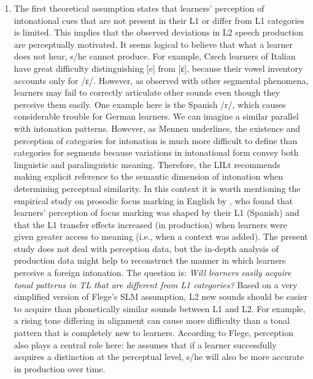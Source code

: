 \begin{enumerate}[label={(\arabic*)}]
\item
         The first theoretical assumption states that learners’ perception of intonational cues that are not present in their L1 or differ from L1 categories is limited. This implies that the observed deviations in L2 speech production are perceptually motivated. It seems logical to believe that what a learner does not hear, s/he cannot produce. For example, Czech learners of Italian have great difficulty distinguishing [e] from [ɛ], because their vowel inventory accounts only for /ɛ/. However, as observed with other segmental phenomena, learners may fail to correctly articulate other sounds even though they perceive them easily. One example here is the Spanish /r/, which causes considerable trouble for German learners. We can imagine a similar parallel with intonation patterns. However, as Mennen underlines, the existence and perception of categories for intonation is much more difficult to define than categories for segments because variations in intonational form convey both linguistic and paralinguistic meaning. Therefore, the LILt recommends making explicit reference to the semantic dimension of intonation when determining perceptual similarity. In this context it is worth mentioning the empirical study on prosodic focus marking in English by \citet{Ortega-LlebariaColantoni2014}, who found that learners’ perception of focus marking was shaped by their L1 (Spanish) and that the L1 transfer effects increased (in production) when learners were given greater access to meaning (i.e., when a context was added). The present study does not deal with perception data, but the in-depth analysis of production data might help to reconstruct the manner in which learners perceive a foreign intonation. The question is: \textit{Will learners easily acquire tonal patterns in TL that are different from L1 categories?} Based on a very simplified version of Flege’s SLM assumption, L2 new sounds should be easier to acquire than phonetically similar sounds between L1 and L2. For example, a rising tone differing in alignment can cause more difficulty than a tonal pattern that is completely new to learners. According to Flege, perception also plays a central role here: he assumes that if a learner successfully acquires a distinction at the perceptual level, s/he will also be more accurate in production over time.






\end{enumerate}
